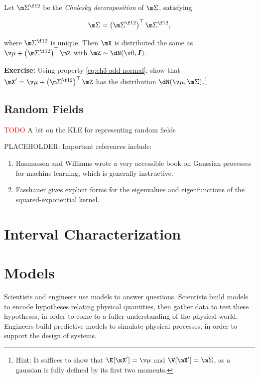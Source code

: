 \documentclass[../primer.tex]{subfiles}
\begin{document}
Let $\m\Sigma^{\f12}$ be the \emph{Cholesky decomposition} of $\m\Sigma$,
satisfying

\begin{equation}
  \m\Sigma = \left(\m\Sigma^{\f12}\right)^{\top} \m\Sigma^{\f12},
\end{equation}

\noindent where $\m\Sigma^{\f12}$ is unique. Then $\mX$ is distributed the same
as $\v\mu + \left(\m\Sigma^{\f12}\right)^{\top}\mZ$ with $\mZ\sim\dN(\v0, \mI)$.

\textbf{Exercise:} Using property \eqref{eq:ch3-add-normal}, show that $\mX' =
\v\mu + \left(\m\Sigma^{\f12}\right)^{\top}\mZ$ has the distribution $\dN(\v\mu,
\m\Sigma)$.\footnote{Hint: It suffices to show that $\E[\mX'] = \v\mu$ and
  $\V[\mX'] = \m\Sigma$, as a gaussian is fully defined by its first two
  moments.}

\subsection{Random Fields}
\textcolor{red}{TODO} A bit on the KLE for representing random fields

PLACEHOLDER: Important references include:

\begin{enumerate}
\item Rasmussen and Williams\cite{rasmussen_gaussian_2006} wrote a very
  accessible book on Gaussian processes for machine learning, which is
  generally instructive.
\item Fasshauer\cite{fasshauer2011positive} gives explicit forms for the
  eigenvalues and eigenfunctions of the squared-exponential kernel.
\end{enumerate}

\section{Interval Characterization} \label{sec:intervals}

\section{Models} \label{sec:models}
Scientists and engineers use models to answer questions. Scientists build models
to encode hypotheses relating physical quantities, then gather data to test
these hypotheses, in order to come to a fuller understanding of the physical
world. Engineers build predictive models to simulate physical processes, in
order to support the design of systems.
\end{document}
